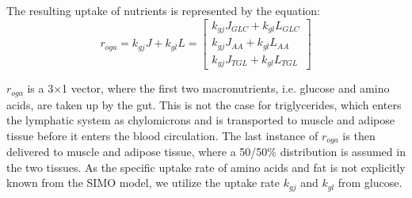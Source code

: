 \documentclass{IEEEtran}
\begin{document}

The resulting uptake of nutrients is represented by the equation:
\begin{equation}
    r_{oga} = k_{gj}J + k_{gl}L = \begin{bmatrix}
           k_{gj}J_{GLC} + k_{gl}L_{GLC} \\
           k_{gj}J_{AA} + k_{gl}L_{AA} \\
           k_{gj}J_{TGL} + k_{gl}L_{TGL}
         \end{bmatrix}
\end{equation}

$r_{oga}$ is a 3$\times$1 vector, where the first two macronutrients, i.e. glucose and amino acids, are taken up by the gut. This is not the case for triglycerides, which enters the lymphatic system as chylomicrons and is transported to muscle and adipose tissue before it enters the blood circulation\cite{gropper_smith_carr_2018}. The last instance of $r_{oga}$ is then delivered to muscle and adipose tissue, where a 50/50\% distribution is assumed in the two tissues. As the specific uptake rate of amino acids and fat is not explicitly known from the SIMO model, we utilize the uptake rate $k_{gj}$ and $k_{gl}$ from glucose.\\
\end{document}
